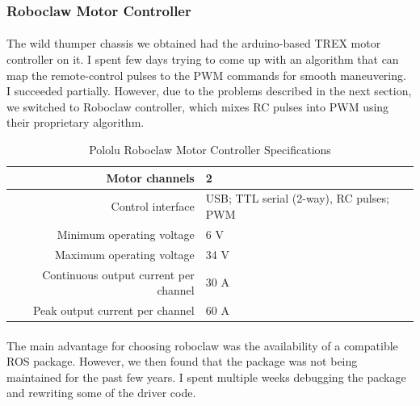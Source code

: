 \subsubsection{Roboclaw Motor Controller}

\paragraph{}
The wild thumper chassis we obtained had the arduino-based TREX motor controller on it. I spent few days trying to come up with an algorithm that can map the remote-control pulses to the PWM commands for smooth maneuvering. I succeeded partially. However, due to the problems described in the next section, we switched to Roboclaw controller, which mixes RC pulses into PWM using their proprietary algorithm.  

\begin{table}[H]
    \begin{center}
        \caption {Pololu Roboclaw Motor Controller Specifications} \label{tab:roboclaw}
        \begin{tabular}{|| r || l ||}    
            \hline
            Motor channels              &   2   \\
            \hline
            Control interface           &	USB; TTL serial (2-way), RC pulses; PWM\\
            \hline
            Minimum operating voltage   &	6 V \\
            \hline
            Maximum operating voltage   &	34 V \\
            \hline
            Continuous output current per channel   &	30 A \\
            \hline
            Peak output current per channel         &	60 A \\
            \hline   
        \end{tabular}    
    \end{center}
\end{table}

\paragraph{}
The main advantage for choosing roboclaw was the availability of a compatible ROS package. However, we then found that the package was not being maintained for the past few years. I spent multiple weeks debugging the package and rewriting some of the driver code.

